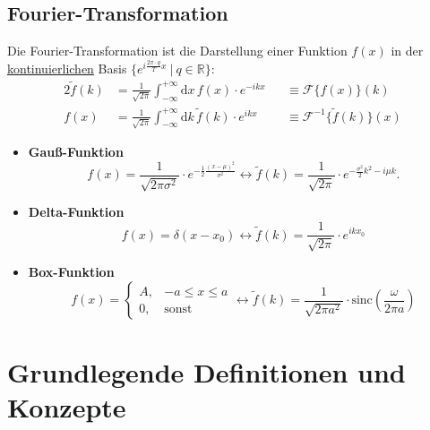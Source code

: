 \documentclass{article}
\newcommand{\diff}{\mathrm{d}}
\newcommand{\lr}[1]{\left(#1\right)}
\begin{document}
\newpage


\subsection{Fourier-Transformation}
Die Fourier-Transformation ist die Darstellung einer Funktion $f(x)$ in der \underline{kontinuierlichen} Basis $\{ e^{i \frac{2\pi \cdot q}{T} x} \ | \ q \in \mathbb{R} \}$:
	\begin{alignat}{2}
		\tilde{f}(k) &= \frac{1}{\sqrt{2\pi}} \int_{-\infty}^{+\infty} \diff x \, f(x) \cdot e^{-i k x} &&\equiv \mathcal{F}\{ f(x) \}(k) \\
		f(x) &= \frac{1}{\sqrt{2\pi}} \int_{-\infty}^{+\infty} \diff k \, \tilde{f}(k) \cdot e^{i k x} &&\equiv \mathcal{F}^{-1}\{ \tilde{f}(k) \}(x)
	\end{alignat}


	\begin{itemize}
		\item \textbf{Gauß-Funktion}
			\begin{equation}
				f(x) = \frac{1}{\sqrt{2 \pi \sigma^2}} \cdot e^{-\frac{1}{2} \frac{(x - \mu)^2}{\sigma^2}} \longleftrightarrow \tilde{f}(k) = \frac{1}{\sqrt{2 \pi}} \cdot e^{- \frac{\sigma^2}{2} k^2 - i \mu k}.
			\end{equation}


		\item \textbf{Delta-Funktion}
			\begin{equation}
				f(x) = \delta(x-x_0) \longleftrightarrow \tilde{f}(k) = \frac{1}{\sqrt{2\pi}} \cdot e^{ikx_0}
			\end{equation}
		
		
		\item \textbf{Box-Funktion}
			\begin{equation}
				f(x) = 
				\begin{cases}
					A, & -a \leq x \leq a \\
					0, & \text{sonst}
				\end{cases}
				\longleftrightarrow
				\tilde{f}(k) = \frac{1}{\sqrt{2\pi a^2}} \cdot \text{sinc} \lr{ \frac{\omega}{2\pi a} }
			\end{equation}
	\end{itemize}


\newpage


\section{Grundlegende Definitionen und Konzepte}
\end{document}
